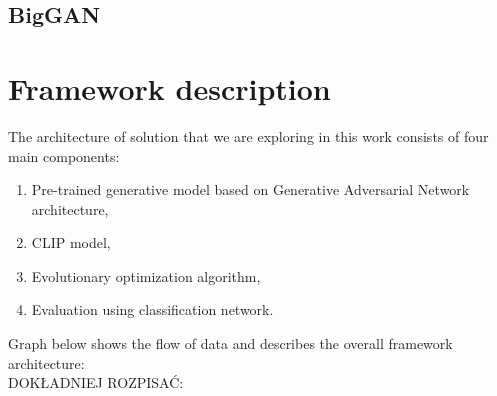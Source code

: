 \documentclass[12pt,a4paper,openany]{book}
\begin{document}





\section{BigGAN}

\chapter{Framework description}

The architecture of solution that we are exploring in this work consists of four main components:
\begin{enumerate}
\item Pre-trained generative model based on Generative Adversarial Network architecture,
\item CLIP model,
\item Evolutionary optimization algorithm,
\item Evaluation using classification network.
\end{enumerate}
Graph below shows the flow of data and describes the overall framework architecture:\\


DOKŁADNIEJ ROZPISAĆ:
\end{document}
